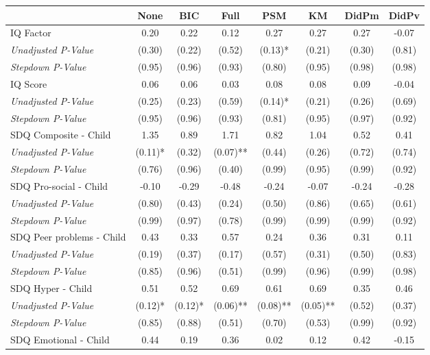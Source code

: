 \begin{tabular}{l c c c c c c c}
\toprule
 & None & BIC & Full & PSM & KM & DidPm & DidPv \\
\midrule
IQ Factor & 0.20 & 0.22 & 0.12 & 0.27 & 0.27 & 0.27 & -0.07 \\
\quad \textit{Unadjusted P-Value} & (0.30) & (0.22) & (0.52) & (0.13)* & (0.21) & (0.30) & (0.81) \\
\quad \textit{Stepdown P-Value} & (0.95) & (0.96) & (0.93) & (0.80) & (0.95) & (0.98) & (0.98) \\
IQ Score & 0.06 & 0.06 & 0.03 & 0.08 & 0.08 & 0.09 & -0.04 \\
\quad \textit{Unadjusted P-Value} & (0.25) & (0.23) & (0.59) & (0.14)* & (0.21) & (0.26) & (0.69) \\
\quad \textit{Stepdown P-Value} & (0.95) & (0.96) & (0.93) & (0.81) & (0.95) & (0.97) & (0.92) \\
SDQ Composite - Child & 1.35 & 0.89 & 1.71 & 0.82 & 1.04 & 0.52 & 0.41 \\
\quad \textit{Unadjusted P-Value} & (0.11)* & (0.32) & (0.07)** & (0.44) & (0.26) & (0.72) & (0.74) \\
\quad \textit{Stepdown P-Value} & (0.76) & (0.96) & (0.40) & (0.99) & (0.95) & (0.99) & (0.92) \\
SDQ Pro-social - Child & -0.10 & -0.29 & -0.48 & -0.24 & -0.07 & -0.24 & -0.28 \\
\quad \textit{Unadjusted P-Value} & (0.80) & (0.43) & (0.24) & (0.50) & (0.86) & (0.65) & (0.61) \\
\quad \textit{Stepdown P-Value} & (0.99) & (0.97) & (0.78) & (0.99) & (0.99) & (0.99) & (0.92) \\
SDQ Peer problems - Child & 0.43 & 0.33 & 0.57 & 0.24 & 0.36 & 0.31 & 0.11 \\
\quad \textit{Unadjusted P-Value} & (0.19) & (0.37) & (0.17) & (0.57) & (0.31) & (0.50) & (0.83) \\
\quad \textit{Stepdown P-Value} & (0.85) & (0.96) & (0.51) & (0.99) & (0.96) & (0.99) & (0.98) \\
SDQ Hyper - Child & 0.51 & 0.52 & 0.69 & 0.61 & 0.69 & 0.35 & 0.46 \\
\quad \textit{Unadjusted P-Value} & (0.12)* & (0.12)* & (0.06)** & (0.08)** & (0.05)** & (0.52) & (0.37) \\
\quad \textit{Stepdown P-Value} & (0.85) & (0.88) & (0.51) & (0.70) & (0.53) & (0.99) & (0.92) \\
SDQ Emotional - Child & 0.44 & 0.19 & 0.36 & 0.02 & 0.12 & 0.42 & -0.15 \\

\end{tabular}
